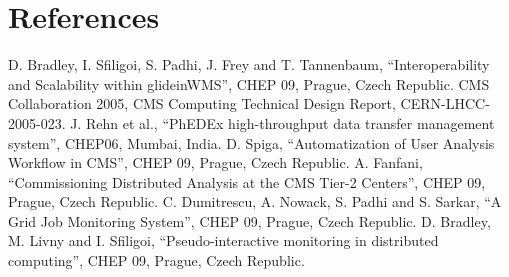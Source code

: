 \documentclass[a4paper]{jpconf}
\begin{document}
\section*{References}
\begin{thebibliography}{15}

D. Bradley, I. Sfiligoi, S. Padhi, J. Frey and T. Tannenbaum, ``Interoperability and Scalability within glideinWMS'', CHEP 09, Prague, Czech Republic.
CMS Collaboration 2005, CMS Computing Technical Design Report, CERN-LHCC-2005-023.
J. Rehn et al., ``PhEDEx high-throughput data transfer management system'', CHEP06, Mumbai, India.
D. Spiga, ``Automatization of User Analysis Workflow in CMS'', CHEP 09, Prague, Czech Republic.
A. Fanfani, ``Commissioning Distributed Analysis at the CMS Tier-2 Centers'', CHEP 09, Prague, Czech Republic.
C. Dumitrescu, A. Nowack, S. Padhi and S. Sarkar, ``A Grid Job Monitoring System'', CHEP 09, Prague, Czech Republic.
D. Bradley, M. Livny and I. Sfiligoi, ``Pseudo-interactive monitoring in distributed computing'', CHEP 09, Prague, Czech Republic.
\end{thebibliography}
\end{document}
